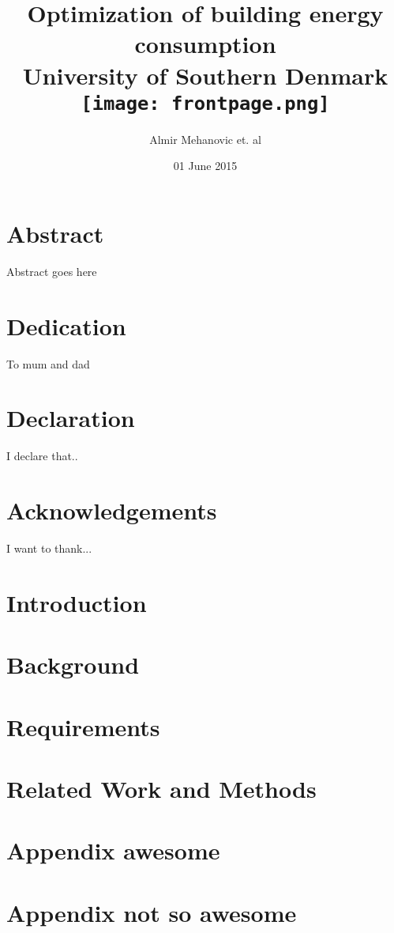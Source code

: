 \documentclass[35pt]{report}
\title{
	{Optimization of building energy consumption}\\
	{\large University of Southern Denmark}\\
	{\texttt{[image: frontpage.png]}}
}
\author{Almir Mehanovic et. al}
\date{01 June 2015}
\begin{document}
\maketitle

\chapter*{Abstract}
Abstract goes here

\chapter*{Dedication}
To mum and dad

\chapter*{Declaration}
I declare that..

\chapter*{Acknowledgements}
I want to thank...

\tableofcontents

\chapter{Introduction}


\chapter{Background}


\chapter{Requirements}


\chapter{Related Work and Methods}



\appendix
\chapter{Appendix awesome}

\chapter{Appendix not so awesome}

\end{document}
